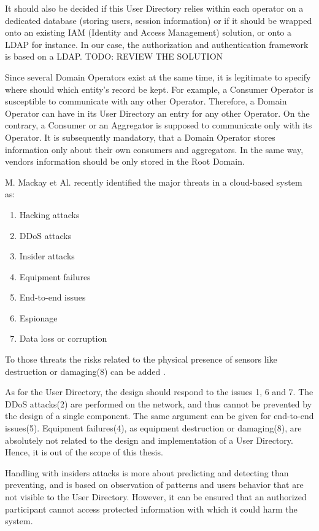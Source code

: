 It should also be decided if this User Directory relies within each operator on a dedicated database (storing users, session information) or if it should be wrapped onto an existing IAM (Identity and Access Management) solution, or onto a LDAP for instance. In our case, the authorization and authentication framework is based on a LDAP.
{ \huge TODO: REVIEW THE SOLUTION }

Since several Domain Operators exist at the same time, it is legitimate to specify where should which entity's record be kept. For example, a Consumer Operator is susceptible to communicate with any other Operator. Therefore, a Domain Operator can have in its User Directory an entry for any other Operator. On the contrary, a Consumer or an Aggregator is supposed to communicate only with its Operator. It is subsequently mandatory, that a Domain Operator stores information only about their own consumers and aggregators. In the same way, vendors information should be only stored in the Root Domain.

M. Mackay et Al. recently identified the major threats in a cloud-based system as\cite{Mackay2012}: 
\begin{enumerate}
	\item Hacking attacks
	\item DDoS attacks
	\item Insider attacks
	\item Equipment failures
	\item End-to-end issues
	\item Espionage
	\item Data loss or corruption
\end{enumerate}

To those threats the risks related to the physical presence of sensors like destruction or damaging(8) can be added .

As for the User Directory, the design should respond to the issues 1, 6 and 7. The DDoS attacks(2) are performed on the network, and thus cannot be prevented by the design of a single component. The same argument can be given for end-to-end issues(5). Equipment failures(4), as equipment destruction or damaging(8), are absolutely not related to the design and implementation of a User Directory. Hence, it is out of the scope of this thesis. 

Handling with insiders attacks is more about predicting and detecting than preventing, and is based on observation of patterns and users behavior that are not visible to the User Directory\cite{Schultz2002}. However, it can be ensured that an authorized participant cannot access protected information with which it could harm the system.

